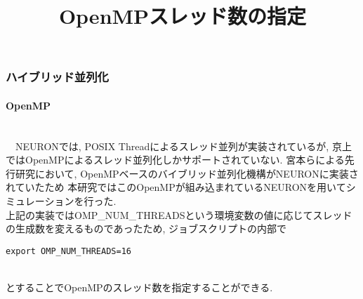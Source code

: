 \subsubsection{ハイブリッド並列化}
\label{subsubsec:hybrid}
\paragraph{OpenMP}~\\
　NEURONでは, POSIX Threadによるスレッド並列が実装されているが, 京上ではOpenMPによるスレッド並列化しかサポートされていない.
宮本らによる先行研究\cite{miyamoto-master}において, OpenMPベースのバイブリッド並列化機構\cite{hybrid}がNEURONに実装されていたため
本研究ではこのOpenMPが組み込まれているNEURONを用いてシミュレーションを行った.\\
上記の実装ではOMP\_NUM\_THREADSという環境変数の値に応じてスレッドの生成数を変えるものであったため, ジョブスクリプトの内部で\\
\begin{table}[htb]
\begin{center}
\title {OpenMPスレッド数の指定}
{\footnotesize
\begin{framed}
\begin{verbatim}
export OMP_NUM_THREADS=16
\end{verbatim}
\end{framed}
}
\end{center}
\end{table}~\\
とすることでOpenMPのスレッド数を指定することができる.

